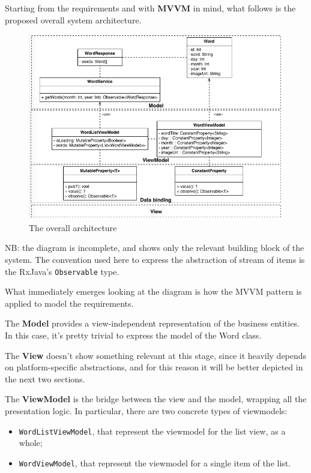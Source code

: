 Starting from the requirements and with \textbf{MVVM} in mind, what
follows is the proposed overall system architecture.

\begin{figure}[htbp]
\centering
\includegraphics[scale=0.5]{imgs/common_arch.png}
\caption{The overall architecture}
\end{figure}

NB: the diagram is incomplete, and shows only the relevant building
block of the system. The convention used here to express the abstraction
of stream of items is the RxJava's \texttt{Observable} type.

What immediately emerges looking at the diagram is how the MVVM pattern
is applied to model the requirements.

The \textbf{Model} provides a view-independent representation of the
business entities. In this case, it's pretty trivial to express the
model of the Word class.

The \textbf{View} doesn't show something relevant at this stage, since
it heavily depends on platform-specific abstractions, and for this
reason it will be better depicted in the next two sections.

The \textbf{ViewModel} is the bridge between the view and the model,
wrapping all the presentation logic. In particular, there are two
concrete types of viewmodels:

\begin{itemize}
\itemsep1pt\parskip0pt
\item
  \texttt{WordListViewModel}, that represent the viewmodel for the list
  view, as a whole;
\item
  \texttt{WordViewModel}, that represent the viewmodel for a single item
  of the list.
\end{itemize}

